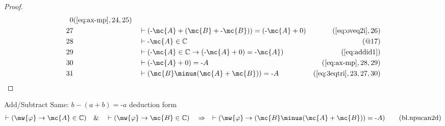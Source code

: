 \begin{proof}
\begin{align}
     0&(\mbox{\ref{eq:ax-mp}},24,25)\notag
  \\ 27 &&  & \vdash ( \textrm{-} \mc{A} + ( \mc{B} + \textrm{-} \mc{B} ) ) = ( \textrm{-} \mc{A} +
     0 )&(\mbox{\ref{eq:oveq2i}},26)\notag
  \\ 28 &&  & \vdash \textrm{-} \mc{A} \in \mathbb{C}&(@17)\notag
  \\ 29 &&  & \vdash ( \textrm{-} \mc{A} \in \mathbb{C} \rightarrow ( \textrm{-} \mc{A} +
     0 ) = \textrm{-} \mc{A} )&(\mbox{\ref{eq:addid1}})\notag
  \\ 30 &&  & \vdash ( \textrm{-} \mc{A} + 0 ) = \textrm{-}
     A&(\mbox{\ref{eq:ax-mp}},28,29)\notag
  \\ 31 &&  & \vdash ( \mc{B} \minus ( \mc{A} + \mc{B} ) ) = \textrm{-}
     A&(\mbox{\ref{eq:3eqtri}},23,27,30)\notag
\end{align}
\end{proof}

\begin{lemma} {Add/Subtract Same: $b \minus ( a + b )
= \textrm{-} a$ deduction form}
\begin{align}
\vdash ( \mw{\varphi} \rightarrow \mc{A} \in \mathbb{C} )\quad\&\quad \vdash (
    \mw{\varphi} \rightarrow \mc{B} \in \mathbb{C} )\quad\Rightarrow\quad \vdash (
    \mw{\varphi} \rightarrow ( \mc{B} \minus ( \mc{A} + \mc{B} ) ) = \textrm{-} A
    )\label{eq:bl.npucan2d}\tag{bl.npucan2d}
\end{align}
\end{lemma}


